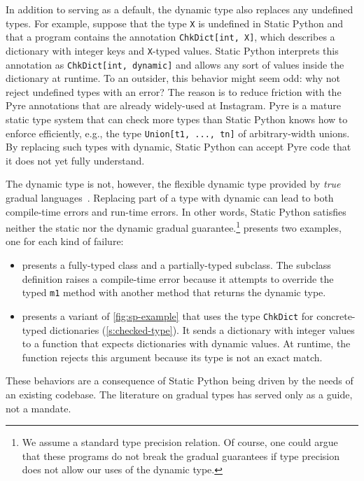 \documentclass[english,cleveref,submission]{programming}
\newcommand{\SP}{Static Python}
\newcommand{\code}[1]{\texttt{#1}}
\begin{document}
In addition to serving as a default, the dynamic type also replaces any undefined types.
For example, suppose that the type \code{X} is undefined in \SP{} and that a
program contains the annotation \code{ChkDict[int, X]}, which describes a
dictionary with integer keys and \code{X}-typed values.
\SP{} interprets this annotation as \code{ChkDict[int, dynamic]} and allows any sort
of values inside the dictionary at runtime.
To an outsider, this behavior might seem odd: why not reject undefined types with an error?
The reason is to reduce friction with the Pyre annotations that are already
widely-used at Instagram.
Pyre is a mature static type system that can check more types than \SP{} knows how to enforce
efficiently, e.g., the type \code{Union[t1, ..., tn]} of arbitrary-width unions.
By replacing such types with dynamic, \SP{} can accept Pyre code that it does not yet fully understand.

The dynamic type is not, however, the flexible dynamic type provided
by \emph{true} gradual languages~\cite{svcb-snapl-2015}.
Replacing part of a type with dynamic can lead to both compile-time errors
and run-time errors.
In other words, \SP{} satisfies neither the static nor the dynamic gradual guarantee.\footnote{We
assume a standard type precision relation. Of course, one could argue that these programs
do not break the gradual guarantees if type precision does not allow our uses of the dynamic type.}
 presents two examples, one for each kind of failure:
\begin{itemize}
  \item
     presents a fully-typed class and a partially-typed subclass.
    The subclass definition raises a compile-time error because it attempts to override
    the typed \code{m1} method with another method that returns the dynamic type.
  \item
     presents a variant of \cref{fig:sp-example} that
    uses the type \code{ChkDict} for concrete-typed dictionaries (\cref{s:checked-type}).
    It sends a dictionary with integer values to a function that expects
    dictionaries with dynamic values.
    At runtime, the function rejects this argument because its type is not an
    exact match.
\end{itemize}
These behaviors are a consequence of \SP{} being driven by the needs of an
existing codebase.
The literature on gradual types has served only as a guide, not a mandate.
\end{document}
